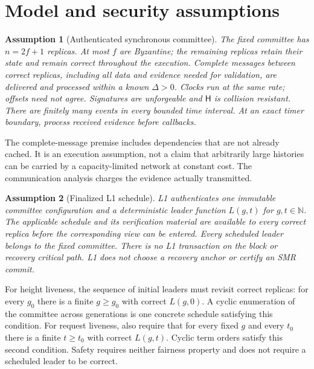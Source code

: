 \documentclass[11pt,a4paper]{article}
\newcommand{\Hash}{\mathsf H}
\newtheorem{assumption}[assumption]{Assumption}
\begin{document}
\section{Model and security assumptions}
\label{sec:model}
\begin{assumption}[Authenticated synchronous committee]
\label{ass:network}
The fixed committee has $n=2f+1$ replicas. At most $f$ are Byzantine;
the remaining replicas retain their state and remain correct throughout
the execution. Complete messages between correct replicas, including all
data and evidence needed for validation, are delivered and processed within
a known $\Delta>0$. Clocks run at the same rate; offsets need not agree.
Signatures are unforgeable and $\Hash$ is collision resistant.
There are finitely many events in every bounded time interval.
At an exact timer boundary, process received evidence before callbacks.
\end{assumption}
The complete-message premise includes dependencies that are not already
cached. It is an execution assumption, not a claim that arbitrarily large
histories can be carried by a capacity-limited network at constant cost.
The communication analysis charges the evidence actually transmitted.

\begin{assumption}[Finalized L1 schedule]
\label{ass:l1}
L1 authenticates one immutable committee configuration and a deterministic
leader function $L(g,t)$ for $g,t\in\mathbb N$. The applicable schedule and
its verification material are available to every correct replica before
the corresponding view can be entered. Every scheduled leader belongs to
the fixed committee. There is no L1 transaction on the block or recovery
critical path. L1 does not choose a recovery anchor or certify an SMR commit.
\end{assumption}
For height liveness, the sequence of initial leaders must revisit correct replicas:
for every $g_0$ there is a finite $g\ge g_0$ with correct $L(g,0)$.
A cyclic enumeration of the committee across generations is one concrete
schedule satisfying this condition. For request liveness, also require that
for every fixed $g$ and every $t_0$ there is a finite $t\ge t_0$ with correct
$L(g,t)$. Cyclic term orders satisfy this second condition. Safety requires
neither fairness property and does not require a scheduled leader to be correct.
\end{document}
